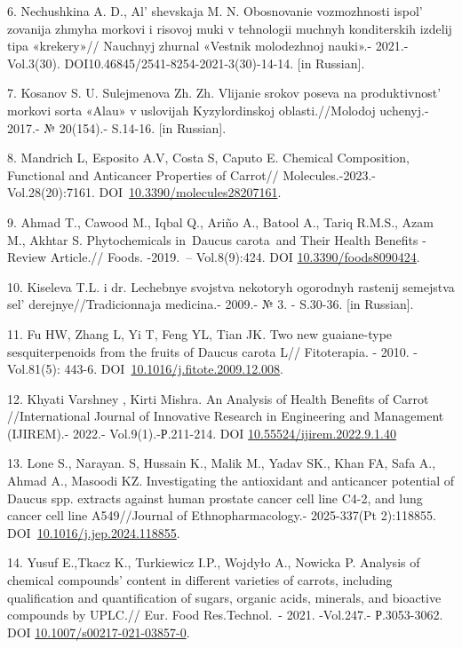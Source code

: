 6. Nechushkina A. D., Al' shevskaja M. N. Obosnovanie
vozmozhnosti ispol' zovanija zhmyha morkovi i risovoj
muki v tehnologii muchnyh konditerskih izdelij tipa «krekery»// Nauchnyj
zhurnal «Vestnik molodezhnoj nauki».- 2021.-Vol.3(30).
DOI10.46845/2541-8254-2021-3(30)-14-14. {[}in Russian{]}.

7. Kosanov S. U. Sulejmenova Zh. Zh. Vlijanie srokov poseva na
produktivnost'{} morkovi sorta «Alau» v uslovijah
Kyzylordinskoj oblasti.//Molodoj uchenyj.- 2017.- № 20(154).- S.14-16.
{[}in Russian{]}.

8. Mandrich L, Esposito A.V, Costa S, Caputo E. Chemical Composition,
Functional and Anticancer Properties of Carrot// Molecules.-2023.-
Vol.28(20):7161.
DOI~\href{https://doi.org/10.3390/molecules28207161}{10.3390/molecules28207161}.

9. Ahmad T., Cawood M., Iqbal Q., Ariño A., Batool A., Tariq R.M.S.,
Azam M., Akhtar S. Phytochemicals in~Daucus carota~and Their Health
Benefits -Review Article.// Foods. -2019.~-- Vol.8(9):424. DOI
\href{https://doi.org/10.3390/foods8090424}{10.3390/foods8090424}.

10. Kiseleva T.L. i dr. Lechebnye svojstva nekotoryh ogorodnyh rastenij
semejstva sel' derejnye//Tradicionnaja medicina.- 2009.-
№ 3. - S.30-36. {[}in Russian{]}.

11. Fu HW, Zhang L, Yi T, Feng YL, Tian JK. Two new guaiane-type
sesquiterpenoids from the fruits of Daucus carota L// Fitoterapia. -
2010. -Vol.81(5): 443-6.
DOI~\href{https://doi.org/10.1016/j.fitote.2009.12.008}{10.1016/j.fitote.2009.12.008}.

12. Khyati Varshney , Kirti Mishra. An Analysis of Health Benefits of
Carrot //International Journal of Innovative Research in Engineering and
Management (IJIREM).- 2022.- Vol.9(1).-Р.211-214. DOI
\href{http://dx.doi.org/10.55524/ijirem.2022.9.1.40}{10.55524/ijirem.2022.9.1.40}

13. Lone S., Narayan. S, Hussain K., Malik M., Yadav SK., Khan FA, Safa
A., Ahmad A., Masoodi KZ. Investigating the antioxidant and anticancer
potential of Daucus spp. extracts against human prostate cancer cell
line C4-2, and lung cancer cell line A549//Journal of
Ethnopharmacology.- 2025-337(Pt 2):118855.
DOI~\href{https://doi.org/10.1016/j.jep.2024.118855}{10.1016/j.jep.2024.118855}.

14. Yusuf E.,Tkacz K., Turkiewicz I.P., Wojdyło A., Nowicka P. Analysis
of chemical compounds' content in different varieties of carrots,
including qualification and quantification of sugars, organic acids,
minerals, and bioactive compounds by UPLC.// Eur. Food Res.Technol.~-
2021. -Vol.247.- Р.3053-3062. DOI
\href{https://link.springer.com/article/10.1007\%2Fs00217-021-03857-0}{10.1007/s00217-021-03857-0}.


